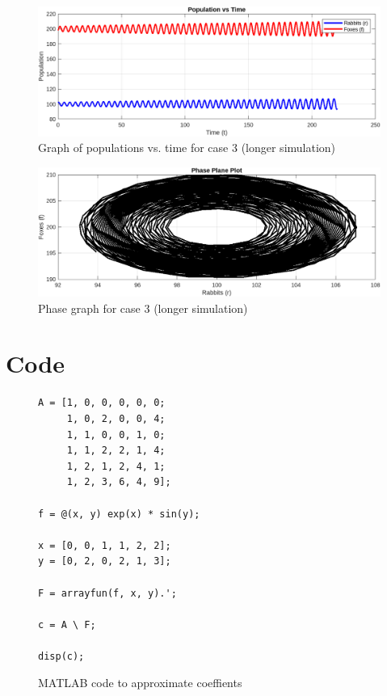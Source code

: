 \documentclass[a4paper, oneside]{article}
\begin{document}
\begin{figure}[h!]
    \centering
    \includegraphics[width=\textwidth]{resources/pop-vs-time-3-long.png}
    \caption{Graph of populations vs. time for case 3 (longer simulation)}
    \label{fig:pop-vs-time-3-long}
\end{figure}
\begin{figure}[h!]
    \centering
    \includegraphics[width=\textwidth]{resources/phase-3-long.png}
    \caption{Phase graph for case 3 (longer simulation)}
    \label{fig:phase-3-long}
\end{figure}

\section{Code}
\begin{figure}[h!]
\begin{verbatim}
A = [1, 0, 0, 0, 0, 0;
     1, 0, 2, 0, 0, 4;
     1, 1, 0, 0, 1, 0;
     1, 1, 2, 2, 1, 4;
     1, 2, 1, 2, 4, 1;
     1, 2, 3, 6, 4, 9];

f = @(x, y) exp(x) * sin(y);

x = [0, 0, 1, 1, 2, 2];
y = [0, 2, 0, 2, 1, 3];

F = arrayfun(f, x, y).';

c = A \ F;

disp(c);

\end{verbatim}
\caption{MATLAB code to approximate coeffients}
\label{fig:exsiny-code}
\end{figure}
\end{document}
